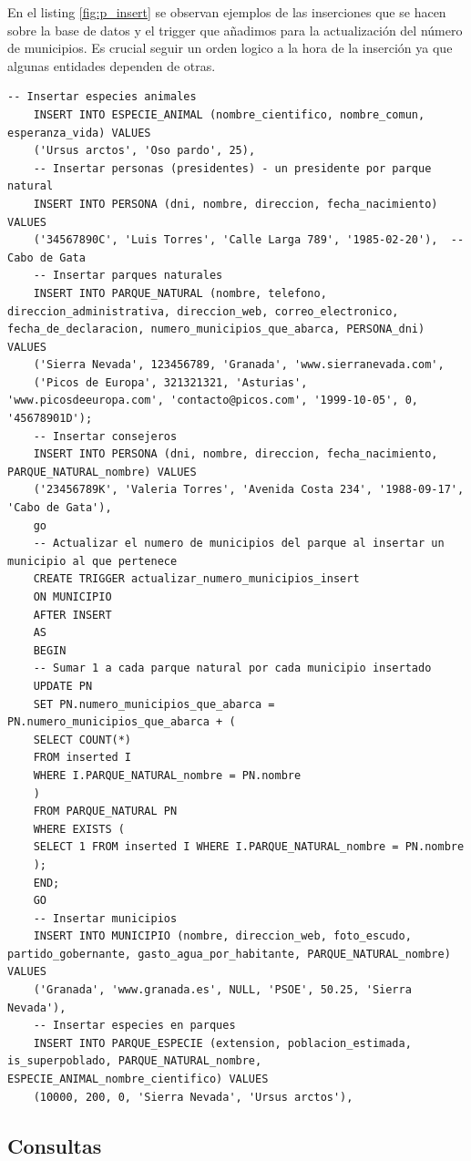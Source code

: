 \documentclass{article}
\begin{document}
En el listing \ref{fig:p_insert} se observan ejemplos de las inserciones que se hacen sobre la base de datos y el trigger que añadimos para la actualización del número de municipios. Es crucial seguir un orden logico a la hora de la inserción ya que algunas entidades dependen de otras.
\begin{lstlisting}[style=sqlstyle, label=fig:p_insert,caption=Carga de datos]
	-- Insertar especies animales
	INSERT INTO ESPECIE_ANIMAL (nombre_cientifico, nombre_comun, esperanza_vida) VALUES
	('Ursus arctos', 'Oso pardo', 25),
	-- Insertar personas (presidentes) - un presidente por parque natural
	INSERT INTO PERSONA (dni, nombre, direccion, fecha_nacimiento) VALUES
	('34567890C', 'Luis Torres', 'Calle Larga 789', '1985-02-20'),  -- Cabo de Gata
	-- Insertar parques naturales
	INSERT INTO PARQUE_NATURAL (nombre, telefono, direccion_administrativa, direccion_web, correo_electronico, fecha_de_declaracion, numero_municipios_que_abarca, PERSONA_dni) VALUES
	('Sierra Nevada', 123456789, 'Granada', 'www.sierranevada.com', 
	('Picos de Europa', 321321321, 'Asturias', 'www.picosdeeuropa.com', 'contacto@picos.com', '1999-10-05', 0, '45678901D');
	-- Insertar consejeros
	INSERT INTO PERSONA (dni, nombre, direccion, fecha_nacimiento, PARQUE_NATURAL_nombre) VALUES
	('23456789K', 'Valeria Torres', 'Avenida Costa 234', '1988-09-17', 'Cabo de Gata'),
	go
	-- Actualizar el numero de municipios del parque al insertar un municipio al que pertenece
	CREATE TRIGGER actualizar_numero_municipios_insert
	ON MUNICIPIO
	AFTER INSERT
	AS
	BEGIN
	-- Sumar 1 a cada parque natural por cada municipio insertado
	UPDATE PN
	SET PN.numero_municipios_que_abarca = PN.numero_municipios_que_abarca + (
	SELECT COUNT(*)
	FROM inserted I
	WHERE I.PARQUE_NATURAL_nombre = PN.nombre
	)
	FROM PARQUE_NATURAL PN
	WHERE EXISTS (
	SELECT 1 FROM inserted I WHERE I.PARQUE_NATURAL_nombre = PN.nombre
	);
	END;
	GO
	-- Insertar municipios
	INSERT INTO MUNICIPIO (nombre, direccion_web, foto_escudo, partido_gobernante, gasto_agua_por_habitante, PARQUE_NATURAL_nombre) VALUES
	('Granada', 'www.granada.es', NULL, 'PSOE', 50.25, 'Sierra Nevada'),
	-- Insertar especies en parques
	INSERT INTO PARQUE_ESPECIE (extension, poblacion_estimada, is_superpoblado, PARQUE_NATURAL_nombre, ESPECIE_ANIMAL_nombre_cientifico) VALUES
	(10000, 200, 0, 'Sierra Nevada', 'Ursus arctos'),
\end{lstlisting}
\subsection{Consultas}
\end{document}
